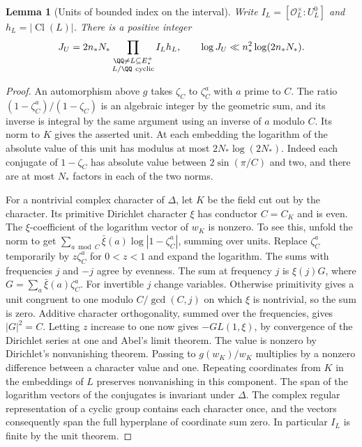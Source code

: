 \documentclass[a4paper,11pt]{article}
\newtheorem{lemma}[proposition]{Lemma}
\theoremstyle{definition}
\theoremstyle{remark}
\numberwithin{equation}{section}
\newcommand{\Cl}{\operatorname{Cl}}
\begin{document}
\begin{lemma}[Units of bounded index on the interval]
\leavevmode\label{lem:explicitunits523}
Write \(I_L=[\mathcal O_L^\times:U_L^0]\) and \(h_L=|\Cl(L)|\).
There is a positive integer
\[
   J_U=2n_*N_*\prod_{\substack{\QQ\ne L\subseteq E_*^+\\
                          L/\QQ\ {\rm cyclic}}} I_L h_L,
 \qquad \log J_U\ll n_*^2\log(2n_*N_*).
\]
\end{lemma}
\begin{proof}
An automorphism above \(g\) takes \(\zeta_C\) to \(\zeta_C^a\) with
\(a\) prime to \(C\). The ratio \((1-\zeta_C^a)/(1-\zeta_C)\) is an
algebraic integer by the geometric sum, and its inverse is integral
by the same argument using an inverse of \(a\) modulo \(C\). Its norm
to \(K\) gives the asserted unit. At each embedding the logarithm of
the absolute value of this unit has modulus at most
\(2N_*\log(2N_*)\). Indeed each conjugate of \(1-\zeta_C\) has
absolute value between \(2\sin(\pi/C)\) and two, and there are at
most \(N_*\) factors in each of the two norms.

For a nontrivial complex character of \(\Delta\), let \(K\) be the
field cut out by the character. Its primitive Dirichlet character
\(\xi\) has conductor \(C=C_K\) and is even. The \(\xi\)-coefficient
of the logarithm vector of \(w_K\) is nonzero. To see this, unfold
the norm to get \(\sum_{a\bmod C}\bar\xi(a)\log|1-\zeta_C^a|\),
summing over units. Replace \(\zeta_C^a\) temporarily by
\(z\zeta_C^a\) for \(0<z<1\) and expand the logarithm. The sums with
frequencies \(j\) and \(-j\) agree by evenness. The sum at frequency
\(j\) is \(\xi(j)G\), where \(G=\sum_a\bar\xi(a)\zeta_C^a\).
For invertible \(j\) change variables. Otherwise primitivity gives
a unit congruent to one modulo \(C/\gcd(C,j)\) on which \(\xi\) is
nontrivial, so the sum is zero. Additive character orthogonality,
summed over the frequencies, gives \(|G|^2=C\). Letting \(z\) increase
to one now gives \(-G L(1,\xi)\), by convergence of the Dirichlet
series at one and Abel's limit theorem. The value is nonzero by
Dirichlet's nonvanishing theorem. Passing to \(g(w_K)/w_K\)
multiplies by a nonzero difference between a character value and one.
Repeating coordinates from \(K\) in the embeddings of \(L\) preserves
nonvanishing in this component. The span of the logarithm vectors
of the conjugates is invariant under \(\Delta\). The complex regular
representation of a cyclic group contains each character once, and
the vectors consequently span the full hyperplane of coordinate sum
zero. In particular \(I_L\) is finite by the unit theorem.


\end{proof}
\end{document}
